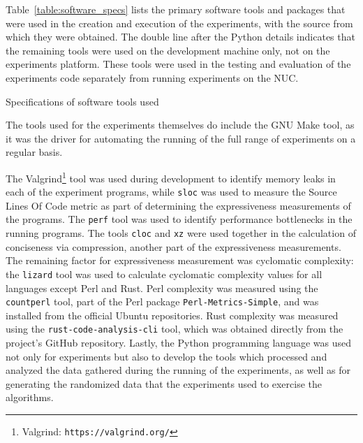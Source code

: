 Table~\ref{table:software_specs} lists the primary software tools and packages that were used in the creation and execution of the experiments, with the source from which they were obtained. The double line after the Python details indicates that the remaining tools were used on the development machine only, not on the experiments platform. These tools were used in the testing and evaluation of the experiments code separately from running experiments on the NUC.

\begin{table}[h!]
\begin{center}

\caption{Specifications of software tools used}
\label{table:software_specs}
\end{center}
\end{table}

The tools used for the experiments themselves do include the GNU Make tool, as it was the driver for automating the running of the full range of experiments on a regular basis.

The Valgrind\footnote{Valgrind: \texttt{https://valgrind.org/}} tool was used during development to identify memory leaks in each of the experiment programs, while \texttt{sloc} was used to measure the Source Lines Of Code metric as part of determining the expressiveness measurements of the programs. The \texttt{perf} tool was used to identify performance bottlenecks in the running programs. The tools \texttt{cloc} and \texttt{xz} were used together in the calculation of conciseness via compression, another part of the expressiveness measurements. The remaining factor for expressiveness measurement was cyclomatic complexity: the \texttt{lizard} tool was used to calculate cyclomatic complexity values for all languages except Perl and Rust. Perl complexity was measured using the \texttt{countperl} tool, part of the Perl package \texttt{Perl-Metrics-Simple}, and was installed from the official Ubuntu repositories. Rust complexity was measured using the \texttt{rust-code-analysis-cli} tool, which was obtained directly from the project's GitHub repository. Lastly, the Python programming language was used not only for experiments but also to develop the tools which processed and analyzed the data gathered during the running of the experiments, as well as for generating the randomized data that the experiments used to exercise the algorithms.
